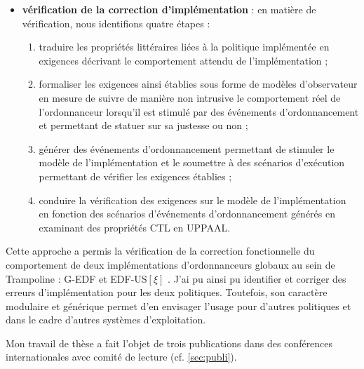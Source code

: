 \begin{itemize}
	\item \textbf{vérification de la correction d'implémentation} :  en matière de vérification, nous identifions quatre étapes :
	
	
	\begin{enumerate}
		\item traduire les propriétés littéraires liées à la politique implémentée en exigences décrivant le comportement attendu de l'implémentation ;
		
		\item formaliser les exigences ainsi établies sous forme de modèles d'observateur en mesure de suivre de manière non intrusive le comportement réel de l’ordonnanceur lorsqu'il est stimulé par des événements d’ordonnancement et permettant de statuer sur sa justesse ou non ;
		
		\item générer des événements d'ordonnancement  permettant de stimuler le modèle de l'implémentation et le soumettre à des scénarios d'exécution permettant de vérifier les exigences établies ;
		
		\item conduire la vérification des exigences sur le modèle de l'implémentation en fonction des scénarios d'événements d'ordonnancement générés en examinant des propriétés CTL \cite{clarke1981design} en UPPAAL.		
	\end{enumerate}
	
\end{itemize}


Cette approche a permis la vérification de la correction fonctionnelle du comportement de deux implémentations d’ordonnanceurs globaux au sein de Trampoline : G-EDF et EDF-US$[\xi]$ \cite{boukir2020requirement}. J'ai pu ainsi pu identifier et corriger des erreurs d'implémentation pour les deux politiques. Toutefois, son caractère modulaire et générique permet d’en envisager l’usage pour d’autres politiques et dans le cadre d’autres systèmes d'exploitation. 


Mon travail de thèse a fait l'objet de trois publications dans des conférences internationales avec comité de lecture (cf. \ref{sec:publi}). 
























